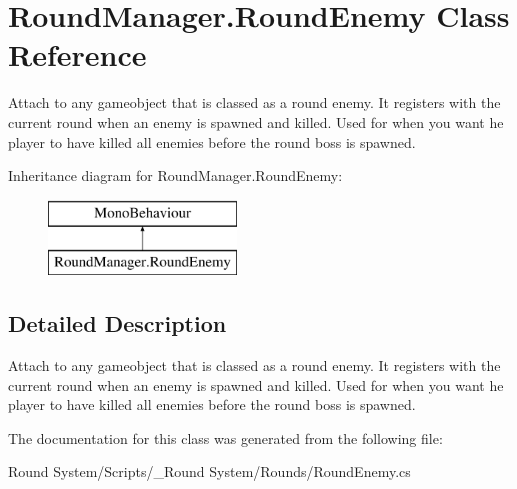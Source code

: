 \hypertarget{class_round_manager_1_1_round_enemy}{}\section{Round\+Manager.\+Round\+Enemy Class Reference}
\label{class_round_manager_1_1_round_enemy}


Attach to any gameobject that is classed as a round enemy. It registers with the current round when an enemy is spawned and killed. Used for when you want he player to have killed all enemies before the round boss is spawned.  


Inheritance diagram for Round\+Manager.\+Round\+Enemy\+:\begin{figure}[H]
\begin{center}
\leavevmode
\includegraphics[height=2.000000cm]{class_round_manager_1_1_round_enemy}
\end{center}
\end{figure}


\subsection{Detailed Description}
Attach to any gameobject that is classed as a round enemy. It registers with the current round when an enemy is spawned and killed. Used for when you want he player to have killed all enemies before the round boss is spawned. 



The documentation for this class was generated from the following file\+:\begin{DoxyCompactItemize}
\item 
Round System/\+Scripts/\+\_\+\+Round System/\+Rounds/Round\+Enemy.\+cs\end{DoxyCompactItemize}
